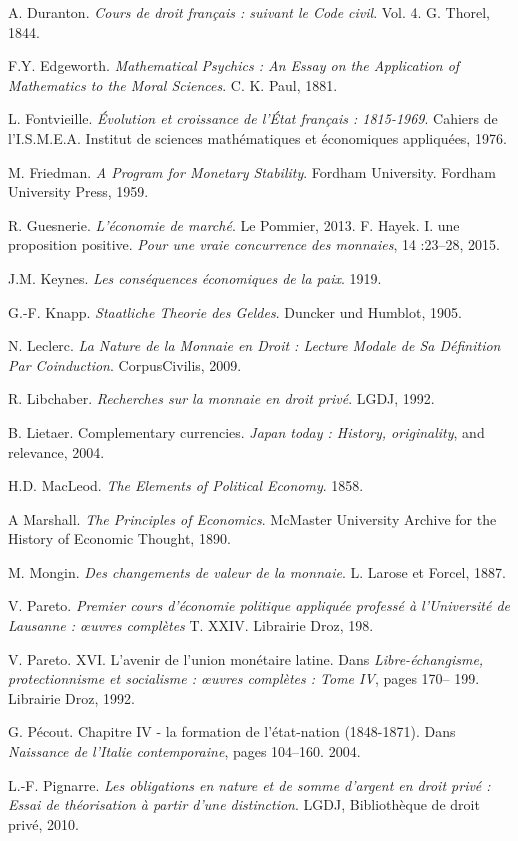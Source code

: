 {A. Duranton. \emph{Cours de droit français : suivant le Code civil}. Vol. 4. G. Thorel, 1844.\par
F.Y. Edgeworth. \emph{Mathematical Psychics : An Essay on the Application of Mathematics to the Moral Sciences}. C. K. Paul, 1881.\par
L. Fontvieille. \emph{Évolution et croissance de l'État français : 1815-1969}. Cahiers de l'I.S.M.E.A. Institut de sciences mathématiques et économiques appliquées, 1976.\par
M. Friedman. \emph{A Program for Monetary Stability}. Fordham University. Fordham University Press, 1959.\par
R. Guesnerie. \emph{L'économie de marché}. Le Pommier, 2013.
F. Hayek. I. une proposition positive. \emph{Pour une vraie concurrence des monnaies}, 14 :23–28, 2015.\par
J.M. Keynes. \emph{Les conséquences économiques de la paix}. 1919.\par
G.-F. Knapp. \emph{Staatliche Theorie des Geldes}. Duncker und Humblot, 1905.\par
N. Leclerc. \emph{La Nature de la Monnaie en Droit : Lecture Modale de Sa Définition Par Coinduction}. CorpusCivilis, 2009.\par
R. Libchaber. \emph{Recherches sur la monnaie en droit privé}. LGDJ, 1992.\par
B. Lietaer. Complementary currencies. \emph{Japan today : History, originality}, and relevance, 2004.\par
H.D. MacLeod. \emph{The Elements of Political Economy}. 1858.\par
A Marshall. \emph{The Principles of Economics}. McMaster University Archive for the History of Economic Thought, 1890.\par
M. Mongin. \emph{Des changements de valeur de la monnaie}. L. Larose et Forcel, 1887.\par
V. Pareto. \emph{Premier cours d'économie politique appliquée professé à l'Université de Lausanne : \oe{}uvres complètes} T. XXIV. Librairie Droz, 198.\par
V. Pareto. XVI. L'avenir de l'union monétaire latine. Dans \emph{Libre-échangisme, protectionnisme et socialisme : \oe{}uvres complètes : Tome IV}, pages 170– 199. Librairie Droz, 1992.\par
G. Pécout. Chapitre IV - la formation de l'état-nation (1848-1871). Dans \emph{Naissance de l'Italie contemporaine}, pages 104–160. 2004.\par
L.-F. Pignarre. \emph{Les obligations en nature et de somme d'argent en droit privé : Essai de théorisation à partir d'une distinction}. LGDJ, Bibliothèque de droit privé, 2010.\par
}
